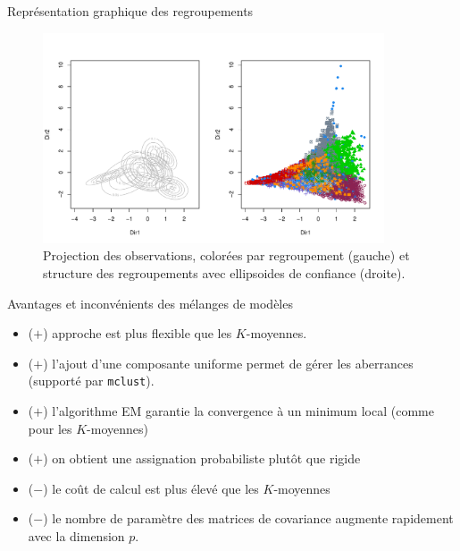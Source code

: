 \documentclass[
  ignorenonframetext,
]{beamer}
\providecommand{\tightlist}{%
  \setlength{\itemsep}{0pt}\setlength{\parskip}{0pt}}\usepackage{longtable,booktabs,array}
\begin{document}
\begin{frame}{Représentation graphique des regroupements}
\protect\hypertarget{repruxe9sentation-graphique-des-regroupements}{}
\begin{figure}

{\centering \includegraphics[width=0.9\textwidth,height=\textheight]{MATH60602-diapos12_files/figure-beamer/fig-classifreducmclust-1.pdf}

}

\caption{\label{fig-classifreducmclust}Projection des observations,
colorées par regroupement (gauche) et structure des regroupements avec
ellipsoides de confiance (droite).}

\end{figure}
\end{frame}

\begin{frame}[fragile]{Avantages et inconvénients des mélanges de
modèles}
\protect\hypertarget{avantages-et-inconvuxe9nients-des-muxe9langes-de-moduxe8les}{}
\begin{itemize}
\tightlist
\item
  (\(+\)) approche est plus flexible que les \(K\)-moyennes.
\item
  (\(+\)) l'ajout d'une composante uniforme permet de gérer les
  aberrances (supporté par \texttt{mclust}).
\item
  (\(+\)) l'algorithme EM garantie la convergence à un minimum local
  (comme pour les \(K\)-moyennes)
\item
  (\(+\)) on obtient une assignation probabiliste plutôt que rigide
\item
  (\(-\)) le coût de calcul est plus élevé que les \(K\)-moyennes
\item
  (\(-\)) le nombre de paramètre des matrices de covariance augmente
  rapidement avec la dimension \(p\).
\end{itemize}
\end{frame}
\end{document}
